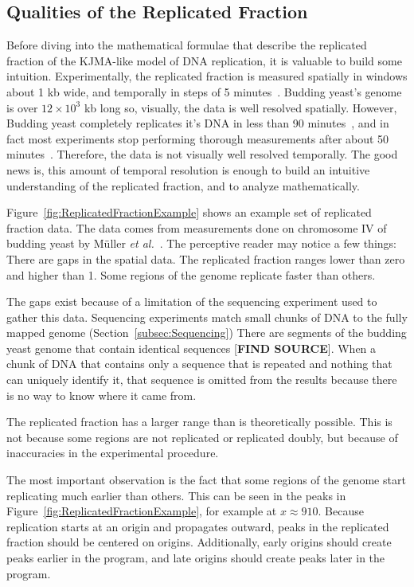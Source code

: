 	
		\subsection{Qualities of the Replicated Fraction}
		\label{subsec:QualitiesReplicatedFraction}
		
		Before diving into the mathematical formulae that describe the replicated fraction of the KJMA-like model of DNA replication, it is valuable to build some intuition.
		Experimentally, the replicated fraction is measured spatially in windows about 1 kb wide, and temporally in steps of 5 minutes~\cite{StochasticTermination}.
		Budding yeast's genome is over $12\times10^3$ kb long so, visually, the data is well resolved spatially.
		However, Budding yeast completely replicates it's DNA in less than 90 minutes~\cite{DeepSeq}, and in fact most experiments stop performing thorough measurements after about 50 minutes~\cite{StochasticTermination,DeepSeq,McCuneMicroArray}.
		Therefore, the data is not visually well resolved temporally.
		The good news is, this amount of temporal resolution is enough to build an intuitive understanding of the replicated fraction, and to analyze mathematically.
		
		Figure~\ref{fig:ReplicatedFractionExample} shows an example set of replicated fraction data.
		The data comes from measurements done on chromosome IV of budding yeast by M{\"u}ller \emph{et al.}~\cite{DeepSeq}.
		The perceptive reader may notice a few things:
		There are gaps in the spatial data.
		The replicated fraction ranges lower than zero and higher than 1.
		Some regions of the genome replicate faster than others.
		
		The gaps exist because of a limitation of the sequencing experiment used to gather this data.
		Sequencing experiments match small chunks of DNA to the fully mapped genome (Section~\ref{subsec:Sequencing})
		There are segments of the budding yeast genome that contain identical sequences [\textbf{FIND SOURCE}].
		When a chunk of DNA that contains only a sequence that is repeated and nothing that can uniquely identify it, that sequence is omitted from the results because there is no way to know where it came from.
		
		The replicated fraction has a larger range than is theoretically possible.
		This is not because some regions are not replicated or replicated doubly, but because of inaccuracies in the experimental procedure.
		
		The most important observation is the fact that some regions of the genome start replicating much earlier than others.
		This can be seen in the peaks in Figure~\ref{fig:ReplicatedFractionExample}, for example at $x \approx 910$.
		Because replication starts at an origin and propagates outward, peaks in the replicated fraction should be centered on origins.
		Additionally, early origins should create peaks earlier in the program, and late origins should create peaks later in the program.
		
